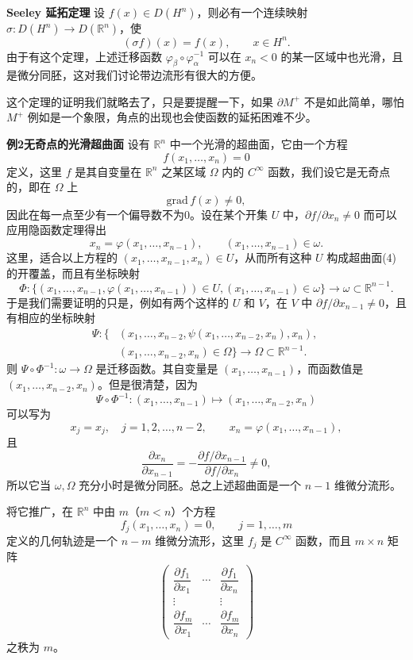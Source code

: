 \noindent\textbf{Seeley 延拓定理}\quad
设 $f(x)\in D(H^n)$，则必有一个连续映射 $\sigma:D(H^n)\to D(\mathbb R^n)$，使
\[
 (\sigma f)(x)=f(x),\qquad x\in H^n.
\]
由于有这个定理，上述迁移函数 $\varphi_\beta\circ\varphi_\alpha^{-1}$ 可以在 $x_n<0$ 的某一区域中也光滑，且是微分同胚，这对我们讨论带边流形有很大的方便。

这个定理的证明我们就略去了，只是要提醒一下，如果 $\partial M^+$ 不是如此简单，哪怕 $M^+$ 例如是一个象限，角点的出现也会使函数的延拓困难不少。

\noindent\textbf{例2\quad 无奇点的光滑超曲面}\quad
设有 $\mathbb R^n$ 中一个光滑的超曲面，它由一个方程
\begin{equation}
 f(x_1,\ldots,x_n)=0
 \tag{4}
\end{equation}
定义，这里 $f$ 是其自变量在 $\mathbb R^n$ 之某区域 $\Omega$ 内的 $C^\infty$ 函数，我们设它是无奇点的，即在 $\Omega$ 上
\[
 \mathrm{grad}\,f(x)\ne0,
\]
因此在每一点至少有一个偏导数不为0。设在某个开集 $U$ 中，$\partial f/\partial x_n\ne0$ 而可以应用隐函数定理得出
\[
 x_n=\varphi(x_1,\ldots,x_{n-1}),\qquad (x_1,\ldots,x_{n-1})\in\omega.
\]
这里，适合以上方程的 $(x_1,\ldots,x_{n-1},x_n)\in U$，从而所有这种 $U$ 构成超曲面(4)的开覆盖，而且有坐标映射
\[
 \Phi:\{(x_1,\ldots,x_{n-1},\varphi(x_1,\ldots,x_{n-1}))\in U,
 (x_1,\ldots,x_{n-1})\in\omega\}\longrightarrow\omega\subset\mathbb R^{n-1}.
\]
于是我们需要证明的只是，例如有两个这样的 $U$ 和 $V$，在 $V$ 中 $\partial f/\partial x_{n-1}\ne0$，且有相应的坐标映射
\[
 \begin{aligned}
 \Psi:\{&(x_1,\ldots,x_{n-2},\psi(x_1,\ldots,x_{n-2},x_n),x_n),\;\\
 &(x_1,\ldots,x_{n-2},x_n)\in\Omega\}\longrightarrow\Omega\subset\mathbb R^{n-1}.
\end{aligned}
\]
则 $\Psi\circ\Phi^{-1}:\omega\to\Omega$ 是迁移函数。\linebreak[4] 其自变量是 $(x_1,\ldots,x_{n-1})$，而函数值是 $(x_1,\ldots,x_{n-2},x_n)$。但是很清楚，因为
\[
 \Psi\circ\Phi^{-1}:(x_1,\ldots,x_{n-1})\longmapsto(x_1,\ldots,x_{n-2},x_n)
\]
可以写为
\[
 x_j=x_j,\quad j=1,2,\ldots,n-2,
 \qquad x_n=\varphi(x_1,\ldots,x_{n-1}),
\]
且
\[
 \frac{\partial x_n}{\partial x_{n-1}}
 =-\frac{\partial f/\partial x_{n-1}}{\partial f/\partial x_n}\ne0,
\]
所以它当 $\omega,\Omega$ 充分小时是微分同胚。总之上述超曲面是一个 $n-1$ 维微分流形。

将它推广，在 $\mathbb R^n$ 中由 $m$（$m<n$）个方程
\begin{equation}
 f_j(x_1,\ldots,x_n)=0,\qquad j=1,\ldots,m
 \tag{5}
\end{equation}
定义的几何轨迹是一个 $n-m$ 维微分流形，这里 $f_j$ 是 $C^\infty$ 函数，而且 $m\times n$ 矩阵
\[
 \begin{pmatrix}
 \dfrac{\partial f_1}{\partial x_1}&\cdots&\dfrac{\partial f_1}{\partial x_n}\\
 \vdots&&\vdots\\
 \dfrac{\partial f_m}{\partial x_1}&\cdots&\dfrac{\partial f_m}{\partial x_n}
 \end{pmatrix}
\]
之秩为 $m$。

